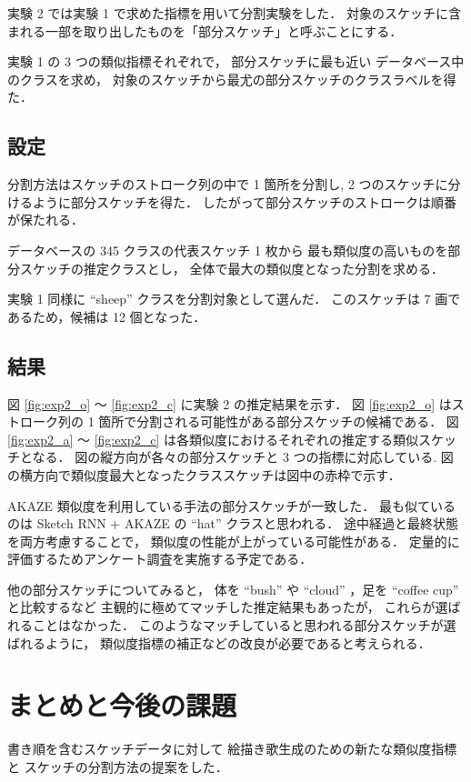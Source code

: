 \documentclass[twocolumn]{jarticle}     %
\begin{document}
実験 2 では実験 1 で求めた指標を用いて分割実験をした．
対象のスケッチに含まれる一部を取り出したものを「部分スケッチ」と呼ぶことにする．

実験 1 の 3 つの類似指標それぞれで，
部分スケッチに最も近い データベース中のクラスを求め，
対象のスケッチから最尤の部分スケッチのクラスラベルを得た．


\subsection{設定}
分割方法はスケッチのストローク列の中で 1 箇所を分割し, 2 つのスケッチに分けるように部分スケッチを得た．
したがって部分スケッチのストロークは順番が保たれる．

データベースの 345 クラスの代表スケッチ 1 枚から
最も類似度の高いものを部分スケッチの推定クラスとし，
全体で最大の類似度となった分割を求める．

実験 1 同様に “sheep” クラスを分割対象として選んだ．
このスケッチは 7 画であるため，候補は 12 個となった．

\subsection{結果}

図 \ref{fig:exp2_o} ～ \ref{fig:exp2_c} に実験 2 の推定結果を示す．
図 \ref{fig:exp2_o} はストローク列の 1 箇所で分割される可能性がある部分スケッチの候補である．
図 \ref{fig:exp2_a} ～ \ref{fig:exp2_c} は各類似度におけるそれぞれの推定する類似スケッチとなる．
図の縦方向が各々の部分スケッチと 3 つの指標に対応している.
図の横方向で類似度最大となったクラススケッチは図中の赤枠で示す．


AKAZE 類似度を利用している手法の部分スケッチが一致した．
最も似ているのは Sketch RNN + AKAZE の “hat” クラスと思われる．
途中経過と最終状態を両方考慮することで，
類似度の性能が上がっている可能性がある．
定量的に評価するためアンケート調査を実施する予定である．

他の部分スケッチについてみると，
体を “bush” や “cloud” ，足を “coffee cup” と比較するなど
主観的に極めてマッチした推定結果もあったが，
これらが選ばれることはなかった．
このようなマッチしていると思われる部分スケッチが選ばれるように，
類似度指標の補正などの改良が必要であると考えられる．


\section{まとめと今後の課題}

書き順を含むスケッチデータに対して
絵描き歌生成のための新たな類似度指標と
スケッチの分割方法の提案をした．
\end{document}
